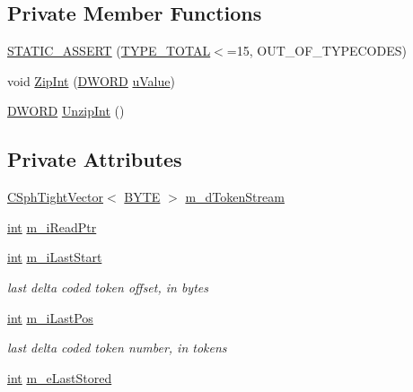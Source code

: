 \subsection*{Private Member Functions}
\begin{DoxyCompactItemize}
\item 
\hyperlink{classCacheStreamer__c_acfd2903d8fa0c45679fa6777378e6752}{S\-T\-A\-T\-I\-C\-\_\-\-A\-S\-S\-E\-R\-T} (\hyperlink{classCacheStreamer__c_a9448525bd59b03890ae82c26a8f46fcfa9f1968a919d3d1f1f7714e28edb72143}{T\-Y\-P\-E\-\_\-\-T\-O\-T\-A\-L}$<$=15, O\-U\-T\-\_\-\-O\-F\-\_\-\-T\-Y\-P\-E\-C\-O\-D\-E\-S)
\item 
void \hyperlink{classCacheStreamer__c_ac267f79b26c5f8b9d6acc56f0562f540}{Zip\-Int} (\hyperlink{sphinxstd_8h_a798af1e30bc65f319c1a246cecf59e39}{D\-W\-O\-R\-D} \hyperlink{sphinxsort_8cpp_a7906295a5b0753053dbc737117036d06}{u\-Value})
\item 
\hyperlink{sphinxstd_8h_a798af1e30bc65f319c1a246cecf59e39}{D\-W\-O\-R\-D} \hyperlink{classCacheStreamer__c_abf3c2c59f8f47100fbc8e2b0da4ce3a8}{Unzip\-Int} ()
\end{DoxyCompactItemize}
\subsection*{Private Attributes}
\begin{DoxyCompactItemize}
\item 
\hyperlink{classCSphTightVector}{C\-Sph\-Tight\-Vector}$<$ \hyperlink{sphinxstd_8h_a4ae1dab0fb4b072a66584546209e7d58}{B\-Y\-T\-E} $>$ \hyperlink{classCacheStreamer__c_ab9f643e1c3f85cf78990ee8699761f78}{m\-\_\-d\-Token\-Stream}
\item 
\hyperlink{sphinxexpr_8cpp_a4a26e8f9cb8b736e0c4cbf4d16de985e}{int} \hyperlink{classCacheStreamer__c_a0020dc2f13ec4b2019377d00375265a4}{m\-\_\-i\-Read\-Ptr}
\item 
\hyperlink{sphinxexpr_8cpp_a4a26e8f9cb8b736e0c4cbf4d16de985e}{int} \hyperlink{classCacheStreamer__c_aace345f536da58417518a267f099e728}{m\-\_\-i\-Last\-Start}
\begin{DoxyCompactList}\small\item\em last delta coded token offset, in bytes \end{DoxyCompactList}\item 
\hyperlink{sphinxexpr_8cpp_a4a26e8f9cb8b736e0c4cbf4d16de985e}{int} \hyperlink{classCacheStreamer__c_a7c69a871908199caa95169a2e9245452}{m\-\_\-i\-Last\-Pos}
\begin{DoxyCompactList}\small\item\em last delta coded token number, in tokens \end{DoxyCompactList}\item 
\hyperlink{sphinxexpr_8cpp_a4a26e8f9cb8b736e0c4cbf4d16de985e}{int} \hyperlink{classCacheStreamer__c_ab1ffe423121a1fe59a3d49347120cf7a}{m\-\_\-e\-Last\-Stored}
\end{DoxyCompactItemize}


